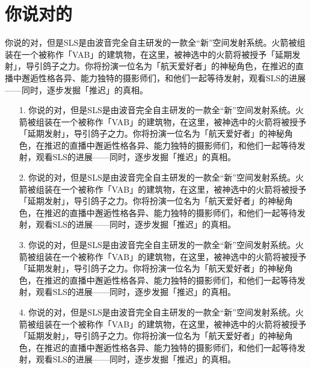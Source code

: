 \section{你说对的}
你说的对，但是SLS是由波音完全自主研发的一款全“新”空间发射系统。火箭被组装在一个被称作「VAB」的建筑物，在这里，被神选中的火箭将被授予「延期发射」，导引鸽子之力。你将扮演一位名为「航天爱好者」的神秘角色，在推迟的直播中邂逅性格各异、能力独特的摄影师们，和他们一起等待发射，观看SLS的进展——同时，逐步发掘「推迟」的真相。

\begin{itemize}
	\item [1.]你说的对，但是SLS是由波音完全自主研发的一款全“新”空间发射系统。火箭被组装在一个被称作「VAB」的建筑物，在这里，被神选中的火箭将被授予「延期发射」，导引鸽子之力。你将扮演一位名为「航天爱好者」的神秘角色，在推迟的直播中邂逅性格各异、能力独特的摄影师们，和他们一起等待发射，观看SLS的进展——同时，逐步发掘「推迟」的真相。
	\item [2.]你说的对，但是SLS是由波音完全自主研发的一款全“新”空间发射系统。火箭被组装在一个被称作「VAB」的建筑物，在这里，被神选中的火箭将被授予「延期发射」，导引鸽子之力。你将扮演一位名为「航天爱好者」的神秘角色，在推迟的直播中邂逅性格各异、能力独特的摄影师们，和他们一起等待发射，观看SLS的进展——同时，逐步发掘「推迟」的真相。
	\item [3.]你说的对，但是SLS是由波音完全自主研发的一款全“新”空间发射系统。火箭被组装在一个被称作「VAB」的建筑物，在这里，被神选中的火箭将被授予「延期发射」，导引鸽子之力。你将扮演一位名为「航天爱好者」的神秘角色，在推迟的直播中邂逅性格各异、能力独特的摄影师们，和他们一起等待发射，观看SLS的进展——同时，逐步发掘「推迟」的真相。
	\item [4.]你说的对，但是SLS是由波音完全自主研发的一款全“新”空间发射系统。火箭被组装在一个被称作「VAB」的建筑物，在这里，被神选中的火箭将被授予「延期发射」，导引鸽子之力。你将扮演一位名为「航天爱好者」的神秘角色，在推迟的直播中邂逅性格各异、能力独特的摄影师们，和他们一起等待发射，观看SLS的进展——同时，逐步发掘「推迟」的真相。
\end{itemize}
